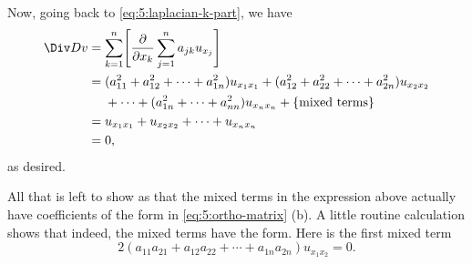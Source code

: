 \begin{solution}
  Now, going back to \eqref{eq:5:laplacian-k-part}, we have
  \begin{align*}
    \Div Dv
    &=\sum_{k=1}^n\Biggl[\frac{\partial}{\partial x_k}\sum_{j=1}^n
      a_{jk}u_{x_j}\Biggr]\\
    &=(a_{11}^2+a_{12}^2+\dotsb+a_{1n}^2)u_{x_1x_1}+(a_{12}^2+a_{22}^2+\dotsb+a_{2n}^2)u_{x_2x_2}\\
    &\phantom{{}={}}+\dotsb+(a_{1n}^2+\dotsb+a_{nn}^2)u_{x_nx_n}+\{\text{mixed
      terms}\}\\
    &=u_{x_1x_1}+u_{x_2x_2}+\dotsb+u_{x_nx_n}\\
    &=0,
  \end{align*}
  as desired.

  All that is left to show as that the mixed terms in the expression above
  actually have coefficients of the form in \eqref{eq:5:ortho-matrix}
  (b). A little routine calculation shows that indeed, the mixed terms have
  the form. Here is the first mixed term
  \[
    2(a_{11}a_{21}+a_{12}a_{22}+\dotsb+a_{1n}a_{2n})u_{x_1x_2}
    =0.
  \]
\end{solution}
\newpage

